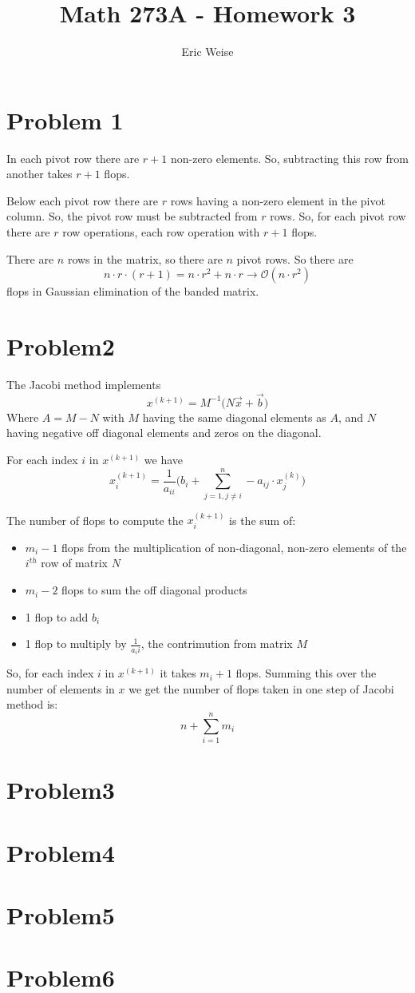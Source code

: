 \documentclass{article}
\title{Math 273A - Homework 3}
\author{Eric Weise}
\begin{document}
\maketitle

\section*{Problem 1}
In each pivot row there are $r+1$ non-zero elements.
So, subtracting this row from another takes $r+1$ flops.

Below each pivot row there are $r$ rows having a non-zero element in the pivot column. So, the pivot row must be subtracted from $r$ rows.
So, for each pivot row there are $r$ row operations, each row operation with $r+1$ flops.

There are $n$ rows in the matrix, so there are $n$ pivot rows.
So there are 
\[n \cdot r \cdot (r+1) = n\cdot r^2 + n \cdot r \to \mathcal{O}(n \cdot r^2) \]
flops in Gaussian elimination of the banded matrix.

\section*{Problem2}
The Jacobi method implements 
\[ x^{(k+1)} = M^{-1}\big(N\vec{x} + \vec{b}\big) \]
Where \(A = M-N\) with $M$ having the same diagonal elements as $A$, and $N$ having negative off diagonal elements and zeros on the diagonal.

For each index $i$ in $x^{(k+1)}$ we have 
\[ x^{(k+1)}_i = \frac{1}{a_{ii}} \Big( b_i + \sum_{j=1, j \neq i}^{n} -a_{ij} \cdot x^{(k)}_j \Big) \]

The number of flops to compute the $x_i^{(k+1)}$ is the sum of:
\begin{itemize}
    \item \(m_i - 1\) flops from the multiplication of non-diagonal, non-zero elements of the $i^{th}$ row of matrix $N$
    \item $m_i - 2$ flops to sum the off diagonal products
    \item 1 flop to add $b_i$
    \item 1 flop to multiply by $\frac{1}{a_ii}$, the contrimution from matrix $M$
\end{itemize}

So, for each index $i$ in $x^{(k+1)}$ it takes $m_i+1$ flops. Summing this over the number of elements in $x$ we get the number of flops taken in one step of Jacobi method is:
\[n + \sum_{i=1}^{n}m_i\]
\section*{Problem3}

\section*{Problem4}

\section*{Problem5}

\section*{Problem6}
\end{document}

